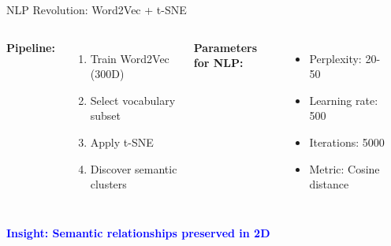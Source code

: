 \documentclass[aspectratio=169]{beamer}
\newcommand{\conceptbox}[2]{\colorbox{#1!20}{\textcolor{#1}{\textbf{#2}}}}
\newcommand{\insight}[1]{\conceptbox{blue}{Insight: #1}}
\begin{document}
\begin{frame}{NLP Revolution: Word2Vec + t-SNE}
\begin{columns}
\textbf{Pipeline:}
\begin{enumerate}
\item Train Word2Vec (300D)
\item Select vocabulary subset
\item Apply t-SNE
\item Discover semantic clusters
\end{enumerate}

\textbf{Parameters for NLP:}
\begin{itemize}
\item Perplexity: 20-50
\item Learning rate: 500
\item Iterations: 5000
\item Metric: Cosine distance
\end{itemize}

\begin{center}
\end{center}
\end{columns}

\insight{Semantic relationships preserved in 2D}
\end{frame}
\end{document}
